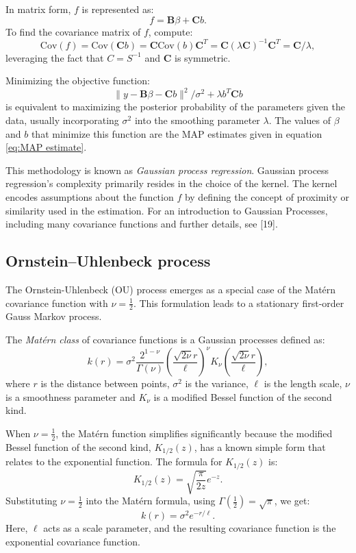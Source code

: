 \documentclass[
11pt, %
oneside, %
english, %
singlespacing, %
]{macthesis} %
\begin{document}
In matrix form, \(f\) is represented as:
\[
f = \mathbf{B} \beta + \mathbf{C}b.
\]
To find the covariance matrix of \(f\), compute:
\[
\text{Cov}(f) = \text{Cov}(\mathbf{C}b) = \mathbf{C} \text{Cov}(b) \mathbf{C}^T = \mathbf{C} (\lambda \mathbf{C})^{-1} \mathbf{C}^T = \mathbf{C} / \lambda,
\]
leveraging the fact that \(C = S^{-1}\) and \(\mathbf{C}\) is symmetric.

Minimizing the objective function:
\[
\|y - \mathbf{B}\beta - \mathbf{C}b\|^2/\sigma^2 + \lambda b^T \mathbf{C} b
\]
is equivalent to maximizing the posterior probability of the parameters given the data, usually incorporating \(\sigma^2\) into the smoothing parameter \(\lambda\). The values of \(\beta\) and \(b\) that minimize this function are the MAP estimates given in equation \ref{eq:MAP estimate}.

This methodology is known as \emph{Gaussian process regression}. Gaussian process regression's complexity primarily resides in the choice of the kernel. The kernel encodes assumptions about the function \(f\) by defining the concept of proximity or similarity used in the estimation. For an introduction to Gaussian Processes, including many covariance functions and further details, see {[}19{]}.

\subsection{Ornstein--Uhlenbeck process}\label{OU}

The Ornstein-Uhlenbeck (OU) process emerges as a special case of the Matérn covariance function with \(\nu = \frac{1}{2}\). This formulation leads to a stationary first-order Gauss Markov process.

The \emph{Matérn class} of covariance functions is a Gaussian processes defined as:
\[
k(r) = \sigma^2 \frac{2^{1-\nu}}{\Gamma(\nu)}\left(\frac{\sqrt{2\nu} r}{\ell}\right)^\nu K_\nu\left(\frac{\sqrt{2\nu} r}{\ell}\right),
\]
where \(r\) is the distance between points, \(\sigma^2\) is the variance, \(\ell\) is the length scale, \(\nu\) is a smoothness parameter and \(K_\nu\) is a modified Bessel function of the second kind.

When \(\nu = \frac{1}{2}\), the Matérn function simplifies significantly because the modified Bessel function of the second kind, \(K_{1/2}(z)\), has a known simple form that relates to the exponential function. The formula for \(K_{1/2}(z)\) is:
\[
K_{1/2}(z) = \sqrt{\frac{\pi}{2z}} e^{-z}.
\]
Substituting \(\nu = \frac{1}{2}\) into the Matérn formula, using \(\Gamma(\frac{1}{2}) = \sqrt{\pi}\), we get:
\[
k(r) = \sigma^2 e^{-r/\ell}.
\]
Here, \(\ell\) acts as a scale parameter, and the resulting covariance function is the exponential covariance function.
\end{document}
